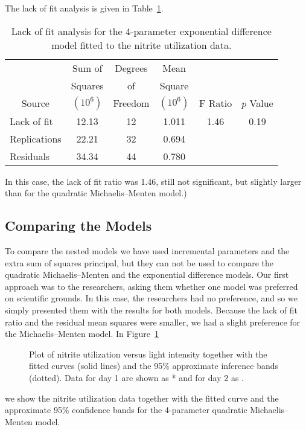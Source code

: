 The lack of fit analysis is given in Table~\ref{tbl:3.11}.
\begin{table}
  \caption{
  Lack of fit analysis for the 4-parameter exponential difference
  model fitted to the nitrite utilization data.}\label{tbl:3.11}
  \begin{center}
    \begin{tabular}{lccccc}\hline
      & \multicolumn{1}{c}{Sum of} & \multicolumn{1}{c}{Degrees} &
      \multicolumn{1}{c}{Mean}\\
      & \multicolumn{1}{c}{Squares} & \multicolumn{1}{c}{of} &
      \multicolumn{1}{c}{Square}\\
      \multicolumn{1}{c}{Source} & \multicolumn{1}{c}{$( 10^6 )$} &
      \multicolumn{1}{c}{Freedom} & \multicolumn{1}{c}{$( 10^6 )$} &
      \multicolumn{1}{c}{F Ratio} & \multicolumn{1}{c}{$p$ Value}\\ \hline
      Lack of fit&12.13&12&1.011&1.46&0.19\\
      Replications&22.21&32&0.694\\ \hline
      Residuals&34.34&44&0.780\\ \hline
    \end{tabular}
  \end{center}
\end{table}
In this case, the lack of fit ratio was 1.46, still not
significant, but slightly larger than for the quadratic
Michaelis--Menten model.)

\subsection{Comparing the Models}

To compare the nested models we have used incremental parameters
and the extra sum of squares principal, but they can not be used
to compare the quadratic Michaelis--Menten and the exponential
difference models.
Our first approach was to the researchers, asking them whether
one model was preferred on scientific grounds.
In this case, the researchers had no
preference, and so we simply presented them
with the results for both models.
Because the lack of fit ratio and the residual mean squares were
smaller, we had a slight preference for the Michaelis--Menten
model.
In Figure~\ref{fig:NITconfband}
\begin{figure}
  \vspace{3in}
  \caption{Plot of nitrite utilization versus light intensity together
    with the fitted curves (solid lines) and the 95\% approximate
    inference bands (dotted).  Data for day 1 are shown as * and for
    day 2 as .}
  \label{fig:NITconfband}
\end{figure}
we show the nitrite utilization data together with
the fitted curve and the approximate 95\% confidence bands for the
4-parameter quadratic Michaelis--Menten model.


